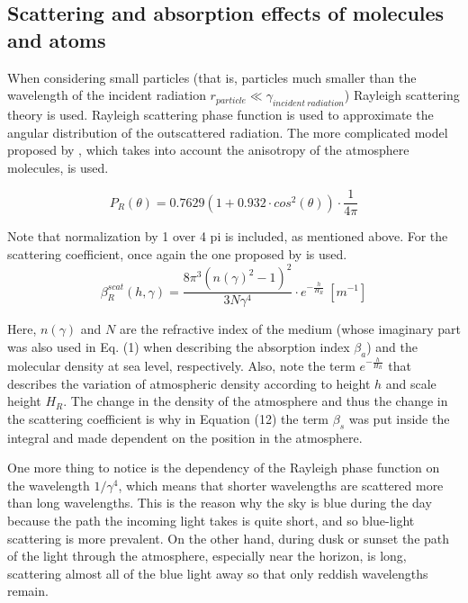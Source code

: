\documentclass{ctuthesis}
\begin{document}
\subsection{Scattering and absorption effects of molecules and atoms}
When considering small particles (that is, particles much smaller than the wavelength of 
the incident radiation $r_{particle} \ll \gamma_{incident\ radiation}$) Rayleigh 
scattering theory is used. Rayleigh scattering phase function is used to approximate 
the angular distribution of the outscattered radiation. The more complicated model proposed by
\cite{costa_bock_emmart_hansen_ynnerman_silva_2021}, which takes into account the anisotropy 
of the atmosphere molecules, is used.

\begin{equation}
    P_{R}(\theta) = 0.7629(1+0.932 \cdot cos^{2}(\theta)) \cdot \frac{1}{4 \pi}
\end{equation}

Note that normalization by 1 over 4 pi is included, as mentioned above. 
For the scattering coefficient, once again the one proposed by 
\cite{costa_bock_emmart_hansen_ynnerman_silva_2021} is used. 
\begin{equation}
    \beta^{scat}_{R}(h, \gamma) = \frac{8 \pi^{3}(n(\gamma)^{2} - 1)^{2}}{3N\gamma^{4}} \cdot e^{-\frac{h}{H_{R}}}\ [m^{-1}]
\end{equation}

Here, $n(\gamma)$ and $N$ are the refractive index of the medium (whose imaginary part was also used in Eq. (1) when describing the absorption index $\beta_{a}$) and the molecular density at sea level, respectively.
Also, note the term $e^{-\frac{h}{H_{R}}}$ that describes the variation of atmospheric density according to height $h$ and scale height $H_{R}$. The change in the density of the atmosphere and
thus the change in the scattering coefficient is why in Equation (12) the term $\beta_{s}$ was put inside the integral and made dependent on the position in the atmosphere.

One more thing to notice is the dependency of the Rayleigh phase function on the 
wavelength $1/\gamma^{4}$, which means that shorter wavelengths are scattered more than long wavelengths.
This is the reason why the sky is blue during the day because the path the incoming light takes is quite short,
and so blue-light scattering is more prevalent. On the other hand, during dusk or sunset the path 
of the light through the atmosphere, especially near the horizon, is long, scattering almost all of 
the blue light away so that only reddish wavelengths remain.
\end{document}

